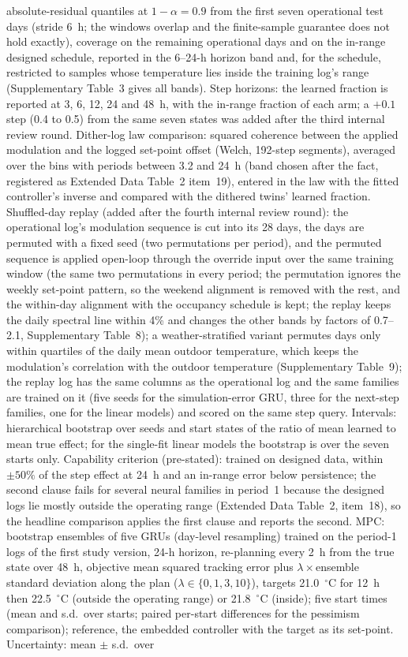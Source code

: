 \documentclass[11pt]{article}
\begin{document}
absolute-residual quantiles at $1-\alpha=0.9$ from the first seven operational test days (stride 6~h; the windows overlap and the finite-sample guarantee does not hold exactly), coverage on the remaining operational days and on the in-range designed schedule, reported in the 6--24-h horizon band and, for the schedule, restricted to samples whose temperature lies inside the training log's range (Supplementary Table~3 gives all bands). Step horizons: the learned fraction is reported at 3, 6, 12, 24 and 48~h, with the in-range fraction of each arm; a $+0.1$ step (0.4 to 0.5) from the same seven states was added after the third internal review round. Dither-log law comparison: squared coherence between the applied modulation and the logged set-point offset (Welch, 192-step segments), averaged over the bins with periods between 3.2 and 24~h (band chosen after the fact, registered as Extended Data Table~2 item~19), entered in the law with the fitted controller's inverse and compared with the dithered twins' learned fraction. Shuffled-day replay (added after the fourth internal review round): the operational log's modulation sequence is cut into its 28 days, the days are permuted with a fixed seed (two permutations per period), and the permuted sequence is applied open-loop through the override input over the same training window (the same two permutations in every period; the permutation ignores the weekly set-point pattern, so the weekend alignment is removed with the rest, and the within-day alignment with the occupancy schedule is kept; the replay keeps the daily spectral line within 4\% and changes the other bands by factors of 0.7--2.1, Supplementary Table~8); a weather-stratified variant permutes days only within quartiles of the daily mean outdoor temperature, which keeps the modulation's correlation with the outdoor temperature (Supplementary Table~9); the replay log has the same columns as the operational log and the same families are trained on it (five seeds for the simulation-error GRU, three for the next-step families, one for the linear models) and scored on the same step query. Intervals: hierarchical bootstrap over seeds and start states of the ratio of mean learned to mean true effect; for the single-fit linear models the bootstrap is over the seven starts only. Capability criterion (pre-stated): trained on designed data, within $\pm50\%$ of the step effect at 24~h and an in-range error below persistence; the second clause fails for several neural families in period~1 because the designed logs lie mostly outside the operating range (Extended Data Table~2, item~18), so the headline comparison applies the first clause and reports the second. MPC: bootstrap ensembles of five GRUs (day-level resampling) trained on the period-1 logs of the first study version, 24-h horizon, re-planning every 2~h from the true state over 48~h, objective mean squared tracking error plus $\lambda\times$ensemble standard deviation along the plan ($\lambda\in\{0,1,3,10\}$), targets 21.0~$^\circ$C for 12~h then 22.5~$^\circ$C (outside the operating range) or 21.8~$^\circ$C (inside); five start times (mean and s.d.\ over starts; paired per-start differences for the pessimism comparison); reference, the embedded controller with the target as its set-point. Uncertainty: mean $\pm$ s.d.\ over 
\end{document}
